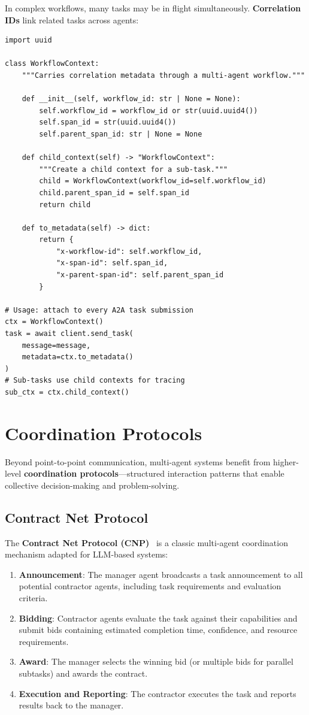 In complex workflows, many tasks may be in flight simultaneously. \textbf{Correlation IDs} link related tasks across agents:

\begin{lstlisting}[style=pythonstyle]
import uuid

class WorkflowContext:
    """Carries correlation metadata through a multi-agent workflow."""

    def __init__(self, workflow_id: str | None = None):
        self.workflow_id = workflow_id or str(uuid.uuid4())
        self.span_id = str(uuid.uuid4())
        self.parent_span_id: str | None = None

    def child_context(self) -> "WorkflowContext":
        """Create a child context for a sub-task."""
        child = WorkflowContext(workflow_id=self.workflow_id)
        child.parent_span_id = self.span_id
        return child

    def to_metadata(self) -> dict:
        return {
            "x-workflow-id": self.workflow_id,
            "x-span-id": self.span_id,
            "x-parent-span-id": self.parent_span_id
        }

# Usage: attach to every A2A task submission
ctx = WorkflowContext()
task = await client.send_task(
    message=message,
    metadata=ctx.to_metadata()
)
# Sub-tasks use child contexts for tracing
sub_ctx = ctx.child_context()
\end{lstlisting}

\section{Coordination Protocols}
\label{sec:a2a:coordination}

Beyond point-to-point communication, multi-agent systems benefit from higher-level \textbf{coordination protocols}---structured interaction patterns that enable collective decision-making and problem-solving.

\subsection{Contract Net Protocol}
\label{contract-net-protocol}

The \textbf{Contract Net Protocol (CNP)}~\cite{smith1980contract} is a classic multi-agent coordination mechanism adapted for LLM-based systems:

\begin{enumerate}
  \item \textbf{Announcement}: The manager agent broadcasts a task announcement to all potential contractor agents, including task requirements and evaluation criteria.
  \item \textbf{Bidding}: Contractor agents evaluate the task against their capabilities and submit bids containing estimated completion time, confidence, and resource requirements.
  \item \textbf{Award}: The manager selects the winning bid (or multiple bids for parallel subtasks) and awards the contract.
  \item \textbf{Execution and Reporting}: The contractor executes the task and reports results back to the manager.
\end{enumerate}


